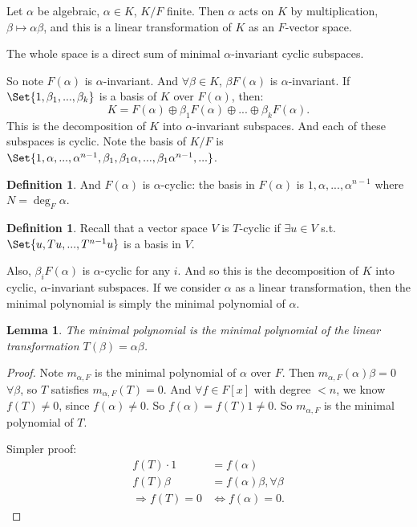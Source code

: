 \documentclass[9pt,reqno,twoside]{amsbook}
\theoremstyle{plain}
\numberwithin{section}{chapter}
\numberwithin{equation}{chapter}
\newtheorem{lem}[theorem]{Lemma}
\theoremstyle{definition}
\newtheorem{Def}[theorem]{Definition}
\theoremstyle{remark}
\theoremstyle{plain}
\newcommand{\bee}{\begin{equation}\begin{aligned}}
\newcommand{\eee}{\end{aligned}\end{equation}}
\begin{document}
Let $\alpha$ be algebraic, $\alpha \in K$, $K/F$ finite. Then $\alpha$ acts on $K$ by multiplication, $\beta \mapsto \alpha\beta$, and this is a linear transformation of $K$ as an $F$-vector space. 

The whole space is a direct sum of minimal $\alpha$-invariant cyclic subspaces. 

So note $F(\alpha)$ is $\alpha$-invariant. And $\forall \beta \in K$, $\beta F(\alpha)$ is $\alpha$-invariant. If $\Set{1,\beta_1,...,\beta_k}$ is a basis of $K$ over $F(\alpha)$, then:
$$
K = F(\alpha) \oplus \beta_1F(\alpha) \oplus ... \oplus \beta_k F(\alpha).
$$
This is the decomposition of $K$ into $\alpha$-invariant subspaces. And each of these subspaces is cyclic. 
Note the basis of $K/F$ is $\Set{1,\alpha,...,\alpha^{n - 1},\beta_1,\beta_1\alpha,...,\beta_1\alpha^{n - 1},...}$. 

\begin{Def}
And $F(\alpha)$ is $\alpha$-cyclic: the basis in $F(\alpha)$ is $1,\alpha,...,\alpha^{n - 1}$ where $N = \deg_F\alpha$. 
\end{Def}

\begin{Def}
Recall that a vector space $V$ is $T$-cyclic if $\exists u \in V$ s.t. $\Set{u,Tu,...,T^{n - 1}u}$ is a basis in $V$. 
\end{Def}

Also, $\beta_iF(\alpha)$ is $\alpha$-cyclic for any $i$. And so this is the decomposition of $K$ into cyclic, $\alpha$-invariant subspaces. If we consider $\alpha$ as a linear transformation, then the minimal polynomial is simply the minimal polynomial of $\alpha$. 

\begin{lem}
The minimal polynomial is the minimal polynomial of the linear transformation $T(\beta) = \alpha\beta$. 
\end{lem}

\begin{proof}
Note $m_{\alpha,F}$ is the minimal polynomial of $\alpha$ over $F$. Then $m_{\alpha,F}(\alpha)\beta = 0$ $\forall \beta$, so $T$ satisfies $m_{\alpha,F}(T) = 0$. And $\forall f \in F[x]$ with degree $< n$, we know $f(T) \neq 0$, since $f(\alpha) \neq 0$. So $f(\alpha) = f(T)1 \neq 0$. So $m_{\alpha,F}$ is the minimal polynomial of $T$. 

Simpler proof:
\bee
f(T)\cdot 1 &= f(\alpha)\\
f(T)\beta &= f(\alpha)\beta, \forall \beta\\
\Rightarrow f(T) = 0 &\Leftrightarrow f(\alpha) = 0.
\eee
\end{proof}
\end{document}
